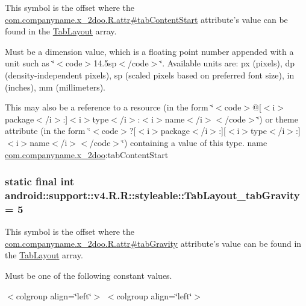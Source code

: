 This symbol is the offset where the \hyperlink{classcom_1_1companyname_1_1x__2doo_1_1_r_1_1attr_f4d0aa05b8d10131f3b057e790e28642}{com.companyname.x\_\-2doo.R.attr\#tabContentStart} attribute's value can be found in the \hyperlink{classandroid_1_1support_1_1v4_1_1_r_1_1styleable_d1f1104cdc4fac0ab4797d48f7efe351}{TabLayout} array.

Must be a dimension value, which is a floating point number appended with a unit such as \char`\"{}$<$code$>$14.5sp$<$/code$>$\char`\"{}. Available units are: px (pixels), dp (density-independent pixels), sp (scaled pixels based on preferred font size), in (inches), mm (millimeters). 

This may also be a reference to a resource (in the form \char`\"{}$<$code$>$@\mbox{[}$<$i$>$package$<$/i$>$:\mbox{]}$<$i$>$type$<$/i$>$:$<$i$>$name$<$/i$>$$<$/code$>$\char`\"{}) or theme attribute (in the form \char`\"{}$<$code$>$?\mbox{[}$<$i$>$package$<$/i$>$:\mbox{]}\mbox{[}$<$i$>$type$<$/i$>$:\mbox{]}$<$i$>$name$<$/i$>$$<$/code$>$\char`\"{}) containing a value of this type.  name \hyperlink{namespacecom_1_1companyname_1_1x__2doo}{com.companyname.x\_\-2doo}:tabContentStart \hypertarget{classandroid_1_1support_1_1v4_1_1_r_1_1styleable_972b042e4a3fcafa9cafaf6453a759e2}{
\subsubsection[{TabLayout\_\-tabGravity}]{\setlength{\rightskip}{0pt plus 5cm}static final int android::support::v4.R.R::styleable::TabLayout\_\-tabGravity = 5}}
\label{classandroid_1_1support_1_1v4_1_1_r_1_1styleable_972b042e4a3fcafa9cafaf6453a759e2}


This symbol is the offset where the \hyperlink{classcom_1_1companyname_1_1x__2doo_1_1_r_1_1attr_a4433cf108f3949506446230cf07dead}{com.companyname.x\_\-2doo.R.attr\#tabGravity} attribute's value can be found in the \hyperlink{classandroid_1_1support_1_1v4_1_1_r_1_1styleable_d1f1104cdc4fac0ab4797d48f7efe351}{TabLayout} array.

Must be one of the following constant values. \begin{TabularC}{0}
\hline
\end{TabularC}
$<$colgroup align=\char`\"{}left\char`\"{}$>$ $<$colgroup align=\char`\"{}left\char`\"{}$>$ 

